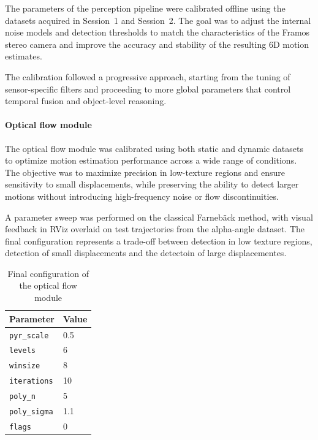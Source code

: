 The parameters of the perception pipeline were calibrated offline using 
the datasets acquired in Session~1 and Session~2. The goal was to adjust 
the internal noise models and detection thresholds to match the 
characteristics of the Framos stereo camera and improve the accuracy 
and stability of the resulting 6D motion estimates.

The calibration followed a progressive approach, starting from the tuning 
of sensor-specific filters and proceeding to more global parameters that 
control temporal fusion and object-level reasoning.

\paragraph{Optical flow module}

The optical flow module was calibrated using both static and dynamic 
datasets to optimize motion estimation performance across a wide 
range of conditions. The objective was to maximize precision in 
low-texture regions and ensure sensitivity to small displacements, 
while preserving the ability to detect larger motions without introducing 
high-frequency noise or flow discontinuities.

A parameter sweep was performed on the classical Farnebäck method, 
with visual feedback in RViz overlaid on test trajectories from the 
alpha-angle dataset. The final configuration represents a trade-off 
between detection in low texture regions, detection of small displacements and the detectoin 
of large displacementes.

\begin{table}[H]
  \centering
  \begin{tabular}{l l}
    \toprule
    \textbf{Parameter} & \textbf{Value} \\
    \midrule
    \texttt{pyr\_scale}    & 0.5 \\
    \texttt{levels}        & 6 \\
    \texttt{winsize}       & 8 \\
    \texttt{iterations}    & 10 \\
    \texttt{poly\_n}       & 5 \\
    \texttt{poly\_sigma}   & 1.1 \\
    \texttt{flags}         & 0 \\
    \bottomrule
  \end{tabular}
  \caption{Final configuration of the optical flow module}\label{tab:optical_flow_params}
\end{table}

